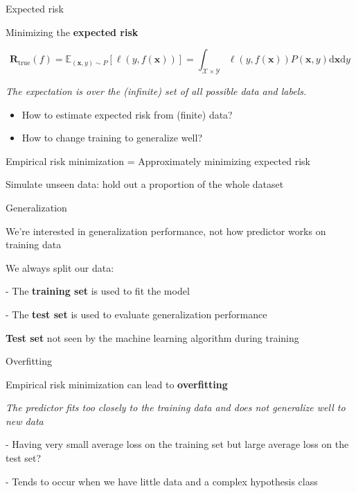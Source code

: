 \documentclass[12pt]{beamer}
\begin{document}
\begin{frame}{Expected risk}
	
Minimizing the \textbf{expected risk}

$$
\mathbf{R}_{\mathrm{true}} (f) = \mathbb{E}_{(\mathbf{x}, y) \sim P} \left[ \ell (y, f(\mathbf{x}))   \right] = 
\int_{\mathcal{X} \times \mathcal{Y}}  \ell (y, f(\mathbf{x})) P(\mathbf{x},y) \mathrm{ d}\mathbf{x} \mathrm{d}y
$$
	

\emph{The expectation is over the (infinite) set of all possible data and labels.}

\begin{itemize}
	\item How to estimate expected risk from (finite) data?
	\item How to change training to generalize well?
\end{itemize}

	



Empirical risk minimization = Approximately minimizing expected risk

Simulate unseen data: hold out a proportion of the whole dataset
	
\end{frame}





\begin{frame}{Generalization}

We're interested in generalization performance, not how predictor works on training data

We always split our data:
	
- The \textbf{training set} is used to fit the model

- The \textbf{test set} is used to evaluate generalization performance
	
\textbf{Test set} not seen by the machine learning algorithm during training
	

	
\end{frame}


\begin{frame}{Overfitting}

Empirical risk minimization can lead to \textbf{overfitting}

\emph{The predictor fits too closely to the training data and does not generalize well to new data}

- Having very small average loss on the training set but large average loss on
the test set?

- Tends to occur when we have little data and a complex hypothesis class
	

\end{frame}
\end{document}
